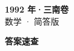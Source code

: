 \documentclass[zihao=-4, a4paper]{ctexart}
\begin{document}
\begin{center}
  {\Large\bfseries 1992 年·三南卷}\\[4pt]
  {\large 数学 · 简答版}
\end{center}
\medskip
{}

\clearpage
{}
\begin{center}{\Large\bfseries 答案速查}\end{center}
\medskip

\end{document}
